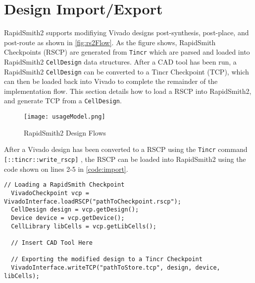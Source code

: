 \newpage

\section{Design Import/Export} \label{sec:import}
\graphicspath{{./techReportFigures/sec8_importExport/}{./techReportFigures/sec2_background/}}

RapidSmith2 supports modifiying Vivado designs post-synthesis, post-place, and
post-route as shown in \autoref{fig:rs2Flow}. As the figure shows, RapidSmith
Checkpoints (RSCP) are generated from \texttt{Tincr} which are parsed and loaded
into RapidSmith2 \texttt{CellDesign} data structures. After a CAD tool has been
run, a RapidSmith2 \texttt{CellDesign} can be converted to a Tincr Checkpoint
(TCP), which can then be loaded back into Vivado to complete the remainder of
the implementation flow. This section details how to load a RSCP into
RapidSmith2, and generate TCP from a \texttt{CellDesign}.

\begin{figure}[htb]
\centering
\texttt{[image: usageModel.png]}
\caption{RapidSmith2 Design Flows}
\label{fig:rs2Flow}
\end{figure}

After a Vivado design has been converted to a RSCP using the \texttt{Tincr}
command \texttt{[::tincr\-::write\_rscp]} , the RSCP can be loaded into
RapidSmith2 using the code shown on lines 2-5 in \autoref{code:import}.

\begin{lstlisting}[xleftmargin=1.5em, framexleftmargin=1.5em, caption=How to
import RSCP and export TCP files to and from RapidSmith2, label=code:import]
  // Loading a RapidSmith Checkpoint
  VivadoCheckpoint vcp = VivadoInterface.loadRSCP("pathToCheckpoint.rscp");
  CellDesign design = vcp.getDesign();
  Device device = vcp.getDevice();
  CellLibrary libCells = vcp.getLibCells();

  // Insert CAD Tool Here

  // Exporting the modified design to a Tincr Checkpoint
  VivadoInterface.writeTCP("pathToStore.tcp", design, device, libCells);
\end{lstlisting}

